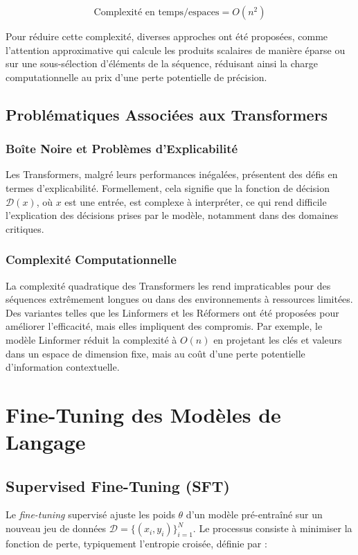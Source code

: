 \documentclass[13pt,a4paper]{article}
\begin{document}
\[
\text{Complexité en temps/espaces} = O(n^2)
\]

Pour réduire cette complexité, diverses approches ont été proposées, comme l'attention approximative qui calcule les produits scalaires de manière éparse ou sur une sous-sélection d'éléments de la séquence, réduisant ainsi la charge computationnelle au prix d'une perte potentielle de précision.

\subsection{Problématiques Associées aux Transformers}

\subsubsection{Boîte Noire et Problèmes d'Explicabilité}

Les Transformers, malgré leurs performances inégalées, présentent des défis en termes d'explicabilité. Formellement, cela signifie que la fonction de décision $\mathcal{D}(x)$, où $x$ est une entrée, est complexe à interpréter, ce qui rend difficile l'explication des décisions prises par le modèle, notamment dans des domaines critiques.

\subsubsection{Complexité Computationnelle}

La complexité quadratique des Transformers les rend impraticables pour des séquences extrêmement longues ou dans des environnements à ressources limitées. Des variantes telles que les Linformers et les Réformers ont été proposées pour améliorer l'efficacité, mais elles impliquent des compromis. Par exemple, le modèle Linformer réduit la complexité à $O(n)$ en projetant les clés et valeurs dans un espace de dimension fixe, mais au coût d'une perte potentielle d'information contextuelle.

\section{Fine-Tuning des Modèles de Langage}

\subsection{Supervised Fine-Tuning (SFT)}

Le \textit{fine-tuning} supervisé ajuste les poids $\theta$ d'un modèle pré-entraîné sur un nouveau jeu de données $\mathcal{D} = \{(x_i, y_i)\}_{i=1}^N$. Le processus consiste à minimiser la fonction de perte, typiquement l'entropie croisée, définie par :
\end{document}
